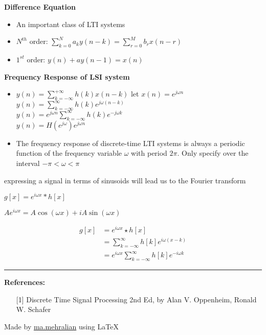 \documentclass{../cheat}
\begin{document}
\begin{multicols}{3}
		\textbf{Difference Equation}
		\begin{itemize}
			\item An important class of LTI systems
			\item $N^{th}$ order: $\sum_{k=0}^{N} a_k y(n-k) = \sum_{r=0}^{M} b_r x(n-r)$
			\item $1^{st}$ order: $y(n)+ay(n-1)=x(n)$
		\end{itemize}
		
		\textbf{Frequency Response of LSI system}
		\begin{itemize}
			\item $y(n)=\sum_{k=-\infty}^{+\infty}	h(k) x(n-k)$ \quad let $x(n)=e^{j \omega n}$\\
				$y(n)=\sum_{k=-\infty}^{\infty} h(k) e^{j\omega (n-k)}$\\
				$y(n)=e^{j\omega n}\sum_{k=-\infty}^{\infty} h(k) e^{- j\omega k}$\\
				$y(n)=H(e^{j\omega})e^{j\omega n}$
			\item The frequency response of discrete-time LTI systems is always a periodic function of the frequency variable $\omega$ with period $2\pi$. Only specify over the interval $-\pi < \omega <\pi$
		\end{itemize}
		
		
		expressing a signal in terms of sinusoids will lead us to the Fourier transform
		
		$g[x] = e^{i\omega x} \ast h[x]$
		
		$A e^{i \omega x}=A \cos( \omega x)+i A\sin( \omega x)$
		
		\begin{align*}
				g[x]&=e^{i\omega x} \star h[x] \nonumber\\
				&=\sum_{k=-\infty}^{\infty}h[k] e^{i\omega(x-k)} \nonumber\\
				&=e^{i\omega x}\sum_{k=-\infty}^{\infty}h[k] e^{-i\omega k}
		\end{align*}
		
\vspace{5mm}
\rule{0.3\linewidth}{0.25pt}
\scriptsize

\textbf{References:}
\begin{itemize}[leftmargin=2em]
	\item [{[1]}] Discrete Time Signal Processing 2nd Ed, by Alan V. Oppenheim, Ronald W. Schafer
\end{itemize}
Made by \href{http://webpages.iust.ac.ir/mehralian/}{ma.mehralian} using \LaTeX
\end{multicols}
\end{document}
